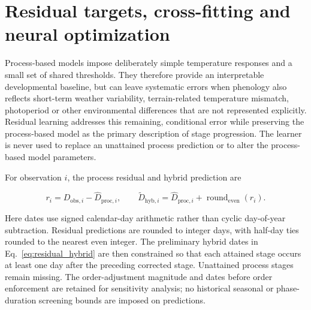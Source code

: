 \documentclass[a4paper,11pt]{article}
\let\OriginalSection\section
\renewcommand{\section}{\FloatBarrier\OriginalSection}
\begin{document}
\section{Residual targets, cross-fitting and neural optimization}

Process-based models impose deliberately simple temperature responses and a small set of shared thresholds. They therefore provide an interpretable developmental baseline, but can leave systematic errors when phenology also reflects short-term weather variability, terrain-related temperature mismatch, photoperiod or other environmental differences that are not represented explicitly. Residual learning addresses this remaining, conditional error while preserving the process-based model as the primary description of stage progression. The learner is never used to replace an unattained process prediction or to alter the process-based model parameters.

For observation $i$, the process residual and hybrid prediction are

\begin{equation}
r_i=D_{\mathrm{obs},i}-\widehat{D}_{\mathrm{proc},i},\qquad
\widetilde{D}_{\mathrm{hyb},i}=\widehat{D}_{\mathrm{proc},i}+\operatorname{round}_{\mathrm{even}}(\widehat{r}_i).
\label{eq:residual_hybrid}
\end{equation}

Here dates use signed calendar-day arithmetic rather than cyclic day-of-year subtraction. Residual predictions are rounded to integer days, with half-day ties rounded to the nearest even integer. The preliminary hybrid dates in Eq.~\ref{eq:residual_hybrid} are then constrained so that each attained stage occurs at least one day after the preceding corrected stage. Unattained process stages remain missing. The order-adjustment magnitude and dates before order enforcement are retained for sensitivity analysis; no historical seasonal or phase-duration screening bounds are imposed on predictions.
\end{document}
